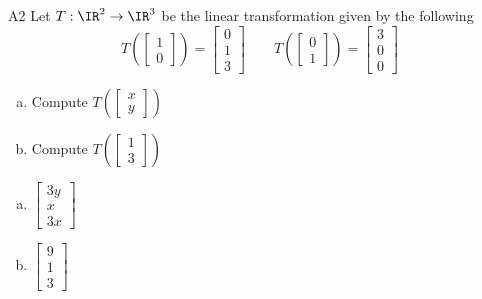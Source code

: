 \begin{problem}{A2}
Let $T: \IR^2 \rightarrow \IR^3$ be the linear transformation given by the following
\[
  T\left(\begin{bmatrix}1\\0\end{bmatrix}\right)
    =
  \begin{bmatrix} 0 \\ 1 \\ 3 \end{bmatrix}
\hspace{2em}
  T\left(\begin{bmatrix}0\\1\end{bmatrix}\right)
    =
  \begin{bmatrix} 3 \\ 0 \\ 0 \end{bmatrix}
\]
\begin{enumerate}[(a)]
\item Compute \( T\left( \begin{bmatrix}x\\ y \end{bmatrix} \right) \)
\item Compute \( T\left( \begin{bmatrix} 1\\ 3\end{bmatrix} \right) \)
\end{enumerate}
\end{problem}
\begin{solution}
\begin{enumerate}[(a)]
\item \(\begin{bmatrix} 3y \\ x \\ 3x  \end{bmatrix}\)
\item \(\begin{bmatrix}  9 \\ 1 \\ 3 \end{bmatrix}\)
\end{enumerate}
\end{solution}



